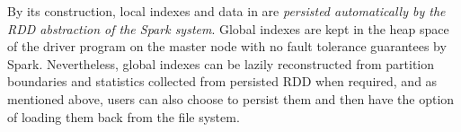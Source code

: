  By its construction, local indexes and
data in \name are {\em persisted automatically by the RDD abstraction
  of the Spark system}. Global indexes are kept in the heap space of
the driver program on the master node with no fault tolerance
guarantees by Spark. Nevertheless, global indexes can be lazily
reconstructed from partition boundaries and statistics collected from
persisted RDD when required, and as mentioned above, users can also
choose to persist them and then have the option of loading them back
from the file system.


